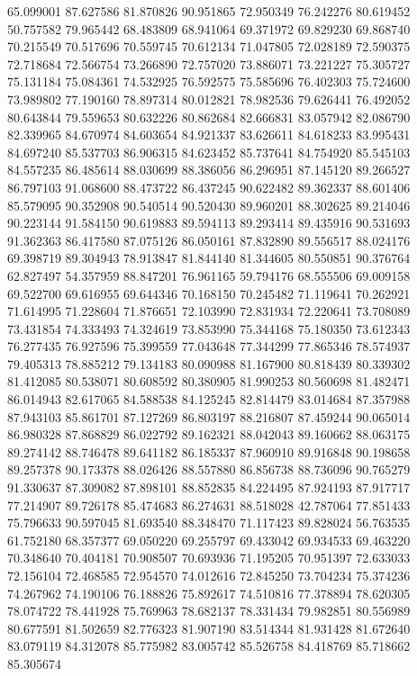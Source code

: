 65.099001
87.627586
81.870826
90.951865
72.950349
76.242276
80.619452
50.757582
79.965442
68.483809
68.941064
69.371972
69.829230
69.868740
70.215549
70.517696
70.559745
70.612134
71.047805
72.028189
72.590375
72.718684
72.566754
73.266890
72.757020
73.886071
73.221227
75.305727
75.131184
75.084361
74.532925
76.592575
75.585696
76.402303
75.724600
73.989802
77.190160
78.897314
80.012821
78.982536
79.626441
76.492052
80.643844
79.559653
80.632226
80.862684
82.666831
83.057942
82.086790
82.339965
84.670974
84.603654
84.921337
83.626611
84.618233
83.995431
84.697240
85.537703
86.906315
84.623452
85.737641
84.754920
85.545103
84.557235
86.485614
88.030699
88.386056
86.296951
87.145120
89.266527
86.797103
91.068600
88.473722
86.437245
90.622482
89.362337
88.601406
85.579095
90.352908
90.540514
90.520430
89.960201
88.302625
89.214046
90.223144
91.584150
90.619883
89.594113
89.293414
89.435916
90.531693
91.362363
86.417580
87.075126
86.050161
87.832890
89.556517
88.024176
69.398719
89.304943
78.913847
81.844140
81.344605
80.550851
90.376764
62.827497
54.357959
88.847201
76.961165
59.794176
68.555506
69.009158
69.522700
69.616955
69.644346
70.168150
70.245482
71.119641
70.262921
71.614995
71.228604
71.876651
72.103990
72.831934
72.220641
73.708089
73.431854
74.333493
74.324619
73.853990
75.344168
75.180350
73.612343
76.277435
76.927596
75.399559
77.043648
77.344299
77.865346
78.574937
79.405313
78.885212
79.134183
80.090988
81.167900
80.818439
80.339302
81.412085
80.538071
80.608592
80.380905
81.990253
80.560698
81.482471
86.014943
82.617065
84.588538
84.125245
82.814479
83.014684
87.357988
87.943103
85.861701
87.127269
86.803197
88.216807
87.459244
90.065014
86.980328
87.868829
86.022792
89.162321
88.042043
89.160662
88.063175
89.274142
88.746478
89.641182
86.185337
87.960910
89.916848
90.198658
89.257378
90.173378
88.026426
88.557880
86.856738
88.736096
90.765279
91.330637
87.309082
87.898101
88.852835
84.224495
87.924193
87.917717
77.214907
89.726178
85.474683
86.274631
88.518028
42.787064
77.851433
75.796633
90.597045
81.693540
88.348470
71.117423
89.828024
56.763535
61.752180
68.357377
69.050220
69.255797
69.433042
69.934533
69.463220
70.348640
70.404181
70.908507
70.693936
71.195205
70.951397
72.633033
72.156104
72.468585
72.954570
74.012616
72.845250
73.704234
75.374236
74.267962
74.190106
76.188826
75.892617
74.510816
77.378894
78.620305
78.074722
78.441928
75.769963
78.682137
78.331434
79.982851
80.556989
80.677591
81.502659
82.776323
81.907190
83.514344
81.931428
81.672640
83.079119
84.312078
85.775982
83.005742
85.526758
84.418769
85.718662
85.305674
